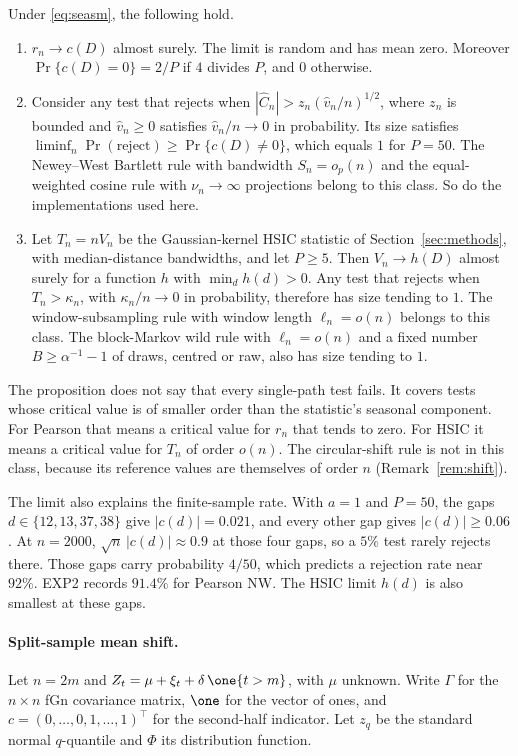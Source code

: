 \begin{proposition}\label{prop:seasm}
Under \eqref{eq:seasm}, the following hold.
\begin{enumerate}[label=(\roman*),nosep]
\item $r_n\to c(D)$ almost surely. The limit is random and has mean zero. Moreover $\Pr\{c(D)=0\}=2/P$ if $4$ divides $P$, and $0$ otherwise.
\item Consider any test that rejects when $|\hat C_n|>z_n(\hat v_n/n)^{1/2}$, where $z_n$ is bounded and $\hat v_n\ge0$ satisfies $\hat v_n/n\to0$ in probability. Its size satisfies $\liminf_n\Pr(\text{reject})\ge\Pr\{c(D)\neq0\}$, which equals $1$ for $P=50$. The Newey--West Bartlett rule with bandwidth $S_n=o_p(n)$ and the equal-weighted cosine rule with $\nu_n\to\infty$ projections belong to this class. So do the implementations used here.
\item Let $T_n=nV_n$ be the Gaussian-kernel HSIC statistic of Section~\ref{sec:methods}, with median-distance bandwidths, and let $P\ge5$. Then $V_n\to h(D)$ almost surely for a function $h$ with $\min_d h(d)>0$. Any test that rejects when $T_n>\kappa_n$, with $\kappa_n/n\to0$ in probability, therefore has size tending to $1$. The window-subsampling rule with window length $\ell_n=o(n)$ belongs to this class. The block-Markov wild rule with $\ell_n=o(n)$ and a fixed number $B\ge\alpha^{-1}-1$ of draws, centred or raw, also has size tending to $1$.
\end{enumerate}
\end{proposition}

The proposition does not say that every single-path test fails. It covers tests whose critical value is of smaller order than the statistic's seasonal component. For Pearson that means a critical value for $r_n$ that tends to zero. For HSIC it means a critical value for $T_n$ of order $o(n)$. The circular-shift rule is not in this class, because its reference values are themselves of order $n$ (Remark~\ref{rem:shift}).

The limit also explains the finite-sample rate. With $a=1$ and $P=50$, the gaps $d\in\{12,13,37,38\}$ give $|c(d)|=0.021$, and every other gap gives $|c(d)|\ge0.06$. At $n=2000$, $\sqrt n\,|c(d)|\approx0.9$ at those four gaps, so a $5\%$ test rarely rejects there. Those gaps carry probability $4/50$, which predicts a rejection rate near $92\%$. EXP2 records $91.4\%$ for Pearson NW. The HSIC limit $h(d)$ is also smallest at these gaps.

\paragraph{Split-sample mean shift.}
Let $n=2m$ and $Z_t=\mu+\xi_t+\delta\,\one\{t>m\}$, with $\mu$ unknown. Write $\Gamma$ for the $n\times n$ fGn covariance matrix, $\one$ for the vector of ones, and $c=(0,\ldots,0,1,\ldots,1)^\top$ for the second-half indicator. Let $z_q$ be the standard normal $q$-quantile and $\Phi$ its distribution function.

